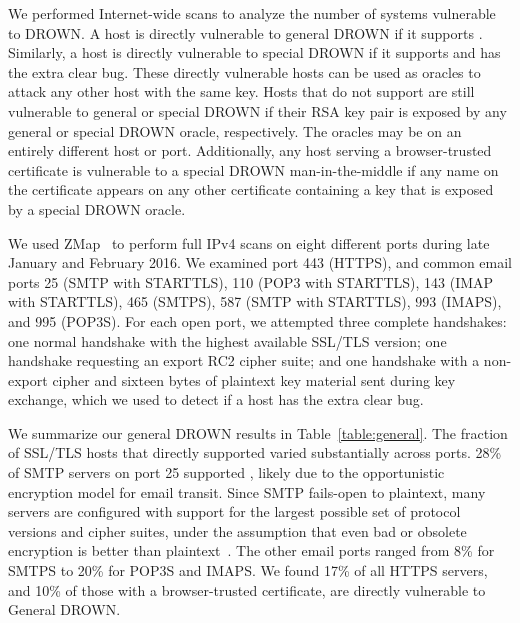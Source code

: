 \label{sec:scans}

\tabSpecialAll

We performed Internet-wide scans to analyze the number of systems vulnerable to
DROWN\@. A host is directly vulnerable to general DROWN if it supports \ssltwo.
Similarly, a host is directly vulnerable to special DROWN if it supports
\ssltwo and has the extra clear bug. These directly vulnerable hosts can be
used as oracles to attack any other host with the same key. Hosts that do not
support \ssltwo are still vulnerable to general or special DROWN if their RSA
key pair is exposed by any general or special DROWN oracle, respectively. The
oracles may be on an entirely different host or port.  Additionally, any host
serving a browser-trusted certificate is vulnerable to a special DROWN
man-in-the-middle if any name on the certificate appears on any other
certificate containing a key that is exposed by a special DROWN oracle.

We used ZMap~\cite{zmap13} to perform full IPv4 scans on eight different ports
during late January and February 2016.  We examined port 443 (HTTPS), and
common email ports 25 (SMTP with STARTTLS), 110 (POP3 with STARTTLS), 143 (IMAP
with STARTTLS), 465 (SMTPS), 587 (SMTP with STARTTLS), 993 (IMAPS), and 995
(POP3S).  For each open port, we attempted three complete handshakes: one
normal handshake with the highest available SSL/TLS version; one \ssltwo
handshake requesting an export RC2 cipher suite; and one \ssltwo handshake with
a non-export cipher and sixteen bytes of plaintext key material sent during key
exchange, which we used to detect if a host has the extra clear bug.

We summarize our general DROWN results in Table~\ref{table:general}. The
fraction of SSL/TLS hosts that directly supported \ssltwo varied substantially
across ports. 28\% of SMTP servers on port 25 supported \ssltwo, likely due to
the opportunistic encryption model for email transit. Since SMTP fails-open to
plaintext, many servers are configured with support for the largest possible
set of protocol versions and cipher suites, under the assumption that even bad
or obsolete encryption is better than plaintext~\cite{better-crypto}. The other
email ports ranged from 8\% for SMTPS to 20\% for POP3S and IMAPS. We found
17\% of all HTTPS servers, and 10\% of those with a browser-trusted
certificate, are directly vulnerable to General DROWN\@.

